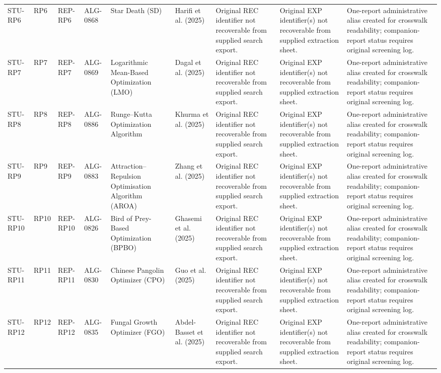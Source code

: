 \documentclass[9pt]{article}
\begin{document}
\begin{landscape}
\begin{longtable}{P{1.5cm}P{1.0cm}P{1.8cm}P{1.8cm}P{5.2cm}P{4.3cm}P{3.4cm}P{3.3cm}P{3.0cm}}
STU-RP6 & RP6 & REP-RP6 & ALG-0868 & Star Death (SD) & Harifi et al. (2025) & Original REC identifier not recoverable from supplied search export. & Original EXP identifier(s) not recoverable from supplied extraction sheet. & One-report administrative alias created for crosswalk readability; companion-report status requires original screening log. \\
STU-RP7 & RP7 & REP-RP7 & ALG-0869 & Logarithmic Mean-Based Optimization (LMO) & Dagal et al. (2025) & Original REC identifier not recoverable from supplied search export. & Original EXP identifier(s) not recoverable from supplied extraction sheet. & One-report administrative alias created for crosswalk readability; companion-report status requires original screening log. \\
STU-RP8 & RP8 & REP-RP8 & ALG-0886 & Runge–Kutta Optimization Algorithm & Khurma et al. (2025) & Original REC identifier not recoverable from supplied search export. & Original EXP identifier(s) not recoverable from supplied extraction sheet. & One-report administrative alias created for crosswalk readability; companion-report status requires original screening log. \\
STU-RP9 & RP9 & REP-RP9 & ALG-0883 & Attraction–Repulsion Optimisation Algorithm (AROA) & Zhang et al. (2025) & Original REC identifier not recoverable from supplied search export. & Original EXP identifier(s) not recoverable from supplied extraction sheet. & One-report administrative alias created for crosswalk readability; companion-report status requires original screening log. \\
STU-RP10 & RP10 & REP-RP10 & ALG-0826 & Bird of Prey-Based Optimization (BPBO) & Ghasemi et al. (2025) & Original REC identifier not recoverable from supplied search export. & Original EXP identifier(s) not recoverable from supplied extraction sheet. & One-report administrative alias created for crosswalk readability; companion-report status requires original screening log. \\
STU-RP11 & RP11 & REP-RP11 & ALG-0830 & Chinese Pangolin Optimizer (CPO) & Guo et al. (2025) & Original REC identifier not recoverable from supplied search export. & Original EXP identifier(s) not recoverable from supplied extraction sheet. & One-report administrative alias created for crosswalk readability; companion-report status requires original screening log. \\
STU-RP12 & RP12 & REP-RP12 & ALG-0835 & Fungal Growth Optimizer (FGO) & Abdel-Basset et al. (2025) & Original REC identifier not recoverable from supplied search export. & Original EXP identifier(s) not recoverable from supplied extraction sheet. & One-report administrative alias created for crosswalk readability; companion-report status requires original screening log. \\

\end{longtable}
\end{landscape}
\end{document}
